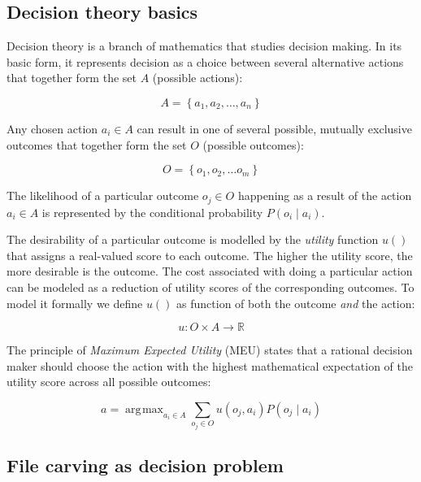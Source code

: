 \documentclass[final,5p,times,twocolumn,authoryear]{elsarticle}
\DeclareMathOperator*{\argmax}{\arg\!\max}
\begin{document}
\subsection{Decision theory basics}

Decision theory is a branch of mathematics that studies decision making. In its basic form, it represents decision as a choice between several alternative actions that together form the set $A$ (possible actions): 

\begin{equation}
A=\left\{a_1,a_2,\dots,a_n\right\}
\end{equation}

Any chosen action $a_i \in A$ can result in one of several possible, mutually exclusive outcomes that together form the set $O$ (possible outcomes):  

\begin{equation}
O=\left\{o_1,o_2,\dots o_m \right\}
\end{equation}

The likelihood of a particular outcome $o_j \in O$ happening as a result of the action $a_i \in A$ is represented by the conditional probability $P(o_i \mid a_i)$. 

The desirability of a particular outcome is modelled by the \emph{utility} function $u()$ that assigns a real-valued score to each outcome. The higher the utility score, the more desirable is the outcome. The cost associated with doing a particular action can be modeled as a reduction of utility scores of the corresponding outcomes. To model it formally we define $u()$ as function of both the outcome \emph{and} the action:

\begin{equation}
u : O \times A \rightarrow \mathbb{R}
\end{equation} 

The principle of \emph{Maximum Expected Utility} (MEU) states that a rational decision maker should choose the action with the highest mathematical expectation of the utility score across all possible outcomes:

\begin{equation} \label{eq:decision}
a = \argmax_{a_i \in A}\sum_{o_j \in O} u(o_j,a_i)P(o_j \mid a_i )
\end{equation}

\subsection{File carving as decision problem}
\end{document}
